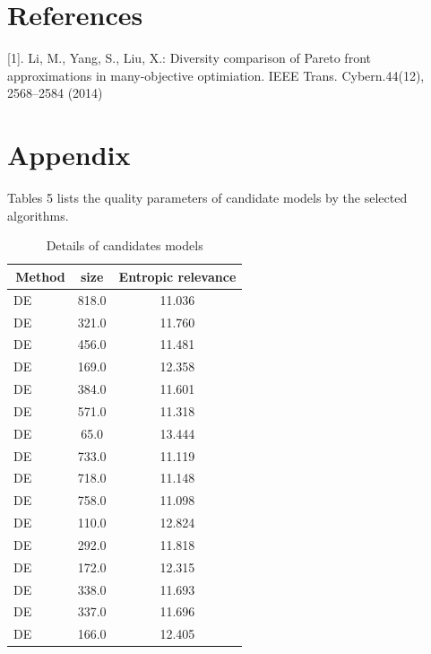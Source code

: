 \documentclass{article}
\begin{document}
\section{References}
[1].  Li, M., Yang, S., Liu, X.: Diversity comparison of Pareto front approximations in many-objective
optimiation. IEEE Trans. Cybern.44(12), 2568–2584 (2014)
\section{Appendix}
Tables 5 lists the quality parameters of candidate models by the selected algorithms.\begin{table}[htbp]
\vspace{-5mm}
\caption{Details of candidates models}\vspace{+1mm}
\label{tbl:5}
\centering %
\setlength{\tabcolsep}{1pt} %
\fontsize{7}{9}\selectfont
\begin{tabular}{|l|c|c|}
\hline
\,Method & size & Entropic relevance \\
\hline %
DE&818.0&11.036\\\hline %
DE&321.0&11.760\\\hline %
DE&456.0&11.481\\\hline %
DE&169.0&12.358\\\hline %
DE&384.0&11.601\\\hline %
DE&571.0&11.318\\\hline %
DE&65.0&13.444\\\hline %
DE&733.0&11.119\\\hline %
DE&718.0&11.148\\\hline %
DE&758.0&11.098\\\hline %
DE&110.0&12.824\\\hline %
DE&292.0&11.818\\\hline %
DE&172.0&12.315\\\hline %
DE&338.0&11.693\\\hline %
DE&337.0&11.696\\\hline %
DE&166.0&12.405\\\hline %

\end{tabular}
\end{table}
\end{document}
